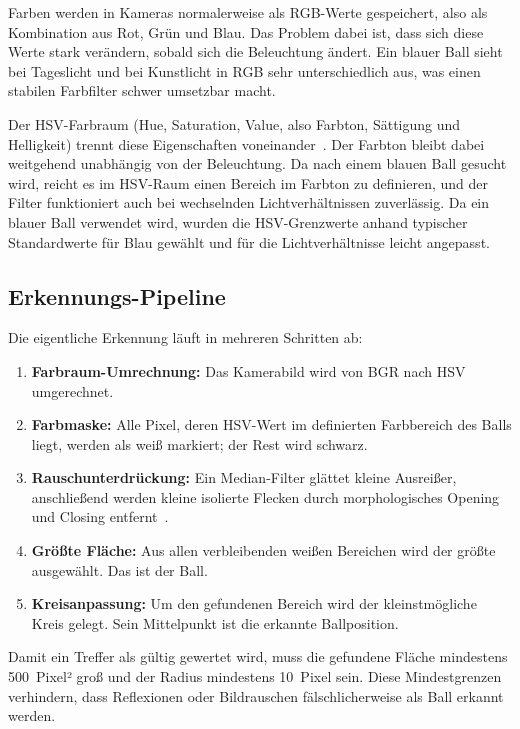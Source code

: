 \documentclass[11pt, a4paper]{scrreprt}
\begin{document}
Farben werden in Kameras normalerweise als RGB-Werte gespeichert, also als
Kombination aus Rot, Grün und Blau. Das Problem dabei ist, dass sich diese
Werte stark verändern, sobald sich die Beleuchtung ändert. Ein blauer
Ball sieht bei Tageslicht und bei Kunstlicht in RGB sehr unterschiedlich aus,
was einen stabilen Farbfilter schwer umsetzbar macht.

Der HSV-Farbraum (Hue, Saturation, Value, also Farbton, Sättigung und
Helligkeit) trennt diese Eigenschaften voneinander~\cite{opencv_colorspaces}. Der Farbton bleibt
dabei weitgehend unabhängig von der Beleuchtung. Da nach einem
blauen Ball gesucht wird, reicht es im HSV-Raum einen Bereich im Farbton
zu definieren, und der Filter funktioniert auch bei wechselnden
Lichtverhältnissen zuverlässig. Da ein blauer Ball verwendet wird,
wurden die HSV-Grenzwerte anhand typischer Standardwerte für Blau
gewählt und für die Lichtverhältnisse leicht angepasst.

\subsection{Erkennungs-Pipeline}

Die eigentliche Erkennung läuft in mehreren Schritten ab:


\begin{enumerate}
  \item \textbf{Farbraum-Umrechnung:} Das Kamerabild wird von BGR nach HSV umgerechnet.
  \item \textbf{Farbmaske:} Alle Pixel, deren HSV-Wert im definierten Farbbereich
        des Balls liegt, werden als weiß markiert; der Rest wird schwarz.
  \item \textbf{Rauschunterdrückung:} Ein Median-Filter glättet kleine Ausreißer,
        anschließend werden kleine isolierte Flecken durch morphologisches
        Opening und Closing entfernt~\cite{opencv_morphology}.
  \item \textbf{Größte Fläche:} Aus allen verbleibenden weißen Bereichen wird der
        größte ausgewählt. Das ist der Ball.
  \item \textbf{Kreisanpassung:} Um den gefundenen Bereich wird der kleinstmögliche
        Kreis gelegt. Sein Mittelpunkt ist die erkannte Ballposition.
\end{enumerate}

Damit ein Treffer als gültig gewertet wird, muss die gefundene Fläche
mindestens 500~Pixel² groß und der Radius mindestens 10~Pixel sein.
Diese Mindestgrenzen verhindern, dass Reflexionen oder Bildrauschen
fälschlicherweise als Ball erkannt werden.
\end{document}
